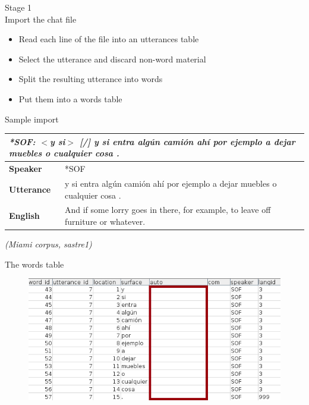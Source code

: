 \documentclass[hyperref={pdfpagelabels=false}, 14pt]{beamer}
\begin{document}
\begin{frame}{Stage 1 \\ Import the chat file}
\begin{itemize}
\item Read each line of the file into an utterances table
\item Select the utterance and discard non-word material
\item Split the resulting utterance into words
\item Put them into a words table
\end{itemize}
\end{frame}


\begin{frame}{Sample import}
\begin{center}
\begin{small}
\begin{tabular}{p{3cm}p{6cm}}
\multicolumn{2}{p{9cm}}{\textit{*SOF: $<$y si$>$ [/] y si entra algún camión ahí por ejemplo a dejar muebles o cualquier cosa . }} \\
\hline\noalign{\smallskip}
\textbf{Speaker} & *SOF \\
\hline\noalign{\smallskip}
\textbf{Utterance} & \textcolor{ESRCblue}{y si entra algún camión ahí por ejemplo a dejar muebles o cualquier cosa .}\\
\hline\noalign{\smallskip}
\textbf{English} & And if some lorry goes in there, for example, to leave off furniture or whatever.
\end{tabular}
\vskip 0.5cm
\hfill\textit{(Miami corpus, sastre1)}
\end{small}
\end{center}
\end{frame}


\begin{frame}{The words table}
  \begin{figure}[h]
  \centering
  \includegraphics[width=\textwidth]{images/words_table1.png}
  \end{figure}
\end{frame}
\end{document}
